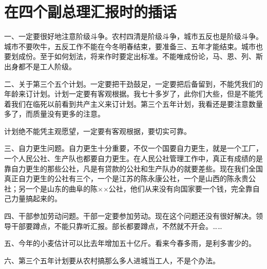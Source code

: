 \section[在四个副总理汇报时的插话（一九六四年五月）]{在四个副总理汇报时的插话}


一、一定要很好地注意阶级斗争。农村四清是阶级斗争，城市五反也是阶级斗争。城市不要吹牛，五反工作不能在今冬明春结束，要准备三、五年才能结束。城市也要划成份。至于如何划法，将来作时要定出标准。不能唯成份论，马、恩、列、斯出身都不是工人阶级。

二、关于第三个五个计划。一定要把干劲鼓足，一定要把后备留到，不能凭我们的年龄来订计划。计划一定要有客观根据。我七十多岁了，此你们大些，但是不能凭着我们在临死以前看到共产主义来订计划。第三个五年计划，我看还是要注意数量多了，而质量没有更多的注意。

计划绝不能凭主观愿望，一定要有客观根据，要切实可靠。

三、自力更生问题。自力更生十分重要，不仅一个国要自力更生，就是一个工厂，一个人民公社、生产队也都要自力更生。在人民公社管理工作中，真正有成绩的是靠自力更生的那些公社，凡是有贷款的公社和生产队办的就要差些。现在我们全国真正自力更生的公社有三个，一个是江苏的陈永康公社，一个是山西的陈永贵公社；另一个是山东的曲阜的陈××公社，他们从来没有向国家要一个钱，完全靠自己力量搞起来的。

四、干部参加劳动问题。干部一定要参加劳动。现在这个问题还没有很好解决。领导干部要蹲点，不能只靠听汇报。部长都要蹲点，不然就不开会。……

五、今年的小麦估计可以比去年增加五十亿斤。看来今春多雨，是利多害少的。

六、第三个五年计划要从农村搞那么多人进城当工人，不是个办法。


